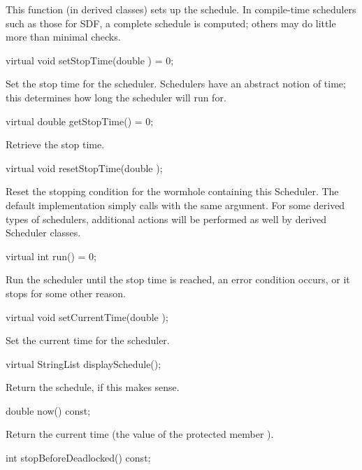 This function (in derived classes) sets up the schedule.  In
compile-time schedulers such as those for SDF, a complete schedule is
computed; others may do little more than minimal checks.

\begin{example}
virtual void setStopTime(double ) = 0;
\end{example}

Set the stop time for the scheduler.  Schedulers have an abstract
notion of time; this determines how long the scheduler will run for.

\begin{example}
virtual double getStopTime() = 0;
\end{example}

Retrieve the stop time.

\begin{example}
virtual void resetStopTime(double );
\end{example}

Reset the stopping condition for the wormhole containing this Scheduler.
The default implementation simply calls  with
the same argument.  For some derived types of schedulers, additional
actions will be performed as well by derived Scheduler classes.

\begin{example}
virtual int run() = 0;
\end{example}

Run the scheduler until the stop time is reached, an error condition
occurs, or it stops for some other reason.

\begin{example}
virtual void setCurrentTime(double );
\end{example}

Set the current time for the scheduler.

\begin{example}
virtual StringList displaySchedule();
\end{example}

Return the schedule, if this makes sense.

\begin{example}
double now() const;
\end{example}

Return the current time (the value of the protected member
).

\begin{example}
int stopBeforeDeadlocked() const;
\end{example}

